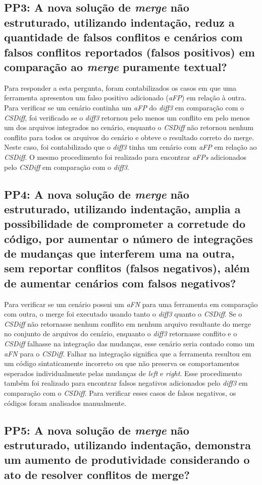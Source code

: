 \subsection{PP3: A nova solução de \emph{merge} não estruturado, utilizando indentação,
	reduz a quantidade de falsos conflitos e cenários com falsos conflitos reportados
	(falsos positivos) em comparação ao \emph{merge} puramente textual?}
Para responder a esta pergunta, foram contabilizados os casos em que uma
ferramenta apresentou um falso positivo adicionado (\emph{aFP}) em relação à outra.
Para verificar se um cenário continha um \emph{aFP} do \emph{diff3} em comparação com o \emph{CSDiff},
foi verificado se o \emph{diff3} retornou pelo menos um conflito em pelo menos um dos arquivos integrados no cenário,
enquanto o \emph{CSDiff} não retornou nenhum conflito para todos os arquivos do cenário e obteve o resultado correto do merge.
Neste caso, foi contabilizado que o \emph{diff3} tinha um cenário com \emph{aFP} em relação ao \emph{CSDiff}.
O mesmo procedimento foi realizado para encontrar \emph{aFPs} adicionados pelo \emph{CSDiff} em comparação com o \emph{diff3}.
\subsection{PP4: A nova solução de \emph{merge} não estruturado, utilizando indentação,
	amplia a possibilidade de comprometer a corretude do código, por aumentar o número de
	integrações de mudanças que interferem uma na outra, sem reportar conflitos (falsos negativos),
	além de aumentar cenários com falsos negativos?}
Para verificar se um cenário possui um \emph{aFN} para uma ferramenta em comparação com outra,
o merge foi executado usando tanto o \emph{diff3} quanto o \emph{CSDiff}. Se o \emph{CSDiff} não retornasse nenhum
conflito em nenhum arquivo resultante do merge no conjunto de arquivos do cenário, enquanto o
\emph{diff3} retornasse conflito e o \emph{CSDiff} falhasse na integração das mudanças, esse cenário seria
contado como um \emph{aFN} para o \emph{CSDiff}. Falhar na integração significa que a ferramenta resultou em um
código sintaticamente incorreto ou que não preserva os comportamentos esperados individualmente pelas
mudanças de \emph{left} e \emph{right}. Esse procedimento também foi realizado para encontrar falsos negativos
adicionados pelo \emph{diff3} em comparação com o \emph{CSDiff}. Para verificar esses casos de falsos negativos,
os códigos foram analisados manualmente.
\subsection{PP5: A nova solução de \emph{merge} não estruturado, utilizando indentação,
	demonstra um aumento de produtividade considerando o ato de resolver conflitos de merge?}

